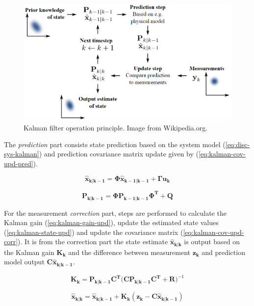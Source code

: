 \documentclass[a4paper]{report}
\begin{document}
\begin{figure}[h]
    \centering
    \includegraphics[scale=0.45]{images/kalman-principle.png}
    \caption{Kalman filter operation principle. Image from Wikipedia.org.}
    \label{fig:kalmanprincip1}
\end{figure}

The \emph{prediction} part consists state prediction based on the system model (\ref{eq:disc-sys-kalman}) and prediction covariance matrix update given by (\ref{eq:kalman-cov-upd-pred}).

\begin{equation}
\mathbf{\hat{x}_{k|k-1}} = \mathbf{\Phi\hat{x}_{k-1|k-1}} + \mathbf{\Gamma u_{k}}
\label{eq:disc-sys-kalman}
\end{equation}

\begin{equation}
\mathbf{P_{k|k-1}} = \mathbf{\Phi P_{k-1|k-1}\Phi^{T}} + \mathbf{Q}
\label{eq:kalman-cov-upd-pred}
\end{equation}

For the measurement \emph{correction} part, steps are performed to calculate the Kalman gain (\ref{eq:kalman-gain-upd}), update the estimated state values (\ref{eq:kalman-state-upd}) and update the covariance matrix (\ref{eq:kalman-cov-upd-corr}). It is from the correction part the state estimate $\mathbf{\hat{x}_{k|k}}$ is output based on the Kalman gain $\mathbf{K_k}$ and the difference between measurement $\mathbf{z_k}$ and prediction model output $\mathbf{C\hat{x}_{k|k-1}}$.

\begin{equation}
\mathbf{K_k} = \mathbf{P_{k|k-1}C^T(C P_{k|k-1} C^T} + \mathbf{R})^{-1}
\label{eq:kalman-gain-upd}
\end{equation}

\begin{equation}
\mathbf{\hat{x}_{k|k}} = \mathbf{\hat{x}_{k|k-1}} + \mathbf{K_k (z_k - C\hat{x}_{k|k-1})}
\label{eq:kalman-state-upd}
\end{equation}
\end{document}
